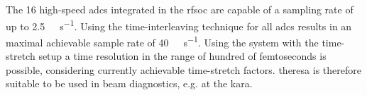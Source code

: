 The 16 high-speed \glspl{adc} integrated in the \gls{rfsoc} are capable of a sampling rate of up to \SI{2.5}{\giga \sample \per \second}.
Using the time-interleaving technique for all \glspl{adc} results in an maximal achievable sample rate of \SI{40}{\giga \sample \per \second}.  %
Using the system with the time-stretch setup a time resolution in the range of hundred of femtoseconds is possible, considering currently achievable time-stretch factors.
\gls{theresa} is therefore suitable to be used in beam diagnostics, e.g. at the \gls{kara}.
